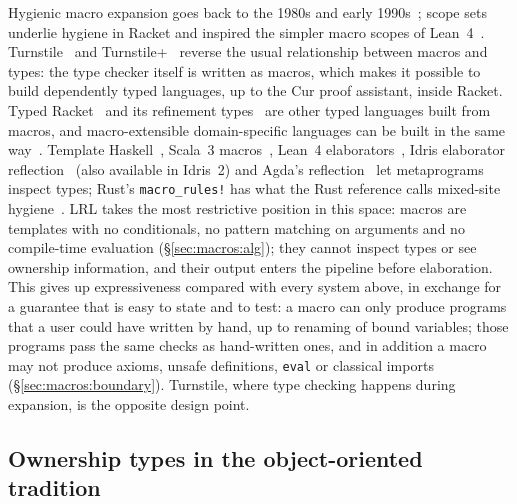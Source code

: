 Hygienic macro expansion goes back to the 1980s and early 1990s~\cite{kohlbecker1986,dybvig1993}; scope sets~\cite{flatt2016scopes} underlie hygiene in Racket and inspired the simpler macro scopes of Lean~4~\cite{ullrich2022}.
Turnstile~\cite{chang2017turnstile} and Turnstile+~\cite{chang2020dependent} reverse the usual relationship between macros and types: the type checker itself is written as macros, which makes it possible to build dependently typed languages, up to the Cur proof assistant, inside Racket.
Typed Racket~\cite{tobinhochstadt2008typedscheme,tobinhochstadt2011languages} and its refinement types~\cite{kent2016occurrence} are other typed languages built from macros, and macro-extensible domain-specific languages can be built in the same way~\cite{ballantyne2020macros}.
Template Haskell~\cite{sheard2002th}, Scala~3 macros~\cite{stucki2018scala,stucki2021multistage}, Lean~4 elaborators~\cite{ullrich2022}, Idris elaborator reflection~\cite{christiansen2016elab} (also available in Idris~2) and Agda's reflection~\cite{vanderwalt2013agda} let metaprograms inspect types; Rust's \lstinline|macro_rules!| has what the Rust reference calls mixed-site hygiene~\cite{rustmacros}.
LRL takes the most restrictive position in this space: macros are templates with no conditionals, no pattern matching on arguments and no compile-time evaluation (\S\ref{sec:macros:alg}); they cannot inspect types or see ownership information, and their output enters the pipeline before elaboration.
This gives up expressiveness compared with every system above, in exchange for a guarantee that is easy to state and to test: a macro can only produce programs that a user could have written by hand, up to renaming of bound variables; those programs pass the same checks as hand-written ones, and in addition a macro may not produce axioms, unsafe definitions, \lstinline|eval| or classical imports (\S\ref{sec:macros:boundary}).
Turnstile, where type checking happens during expansion, is the opposite design point.

\subsection{Ownership types in the object-oriented tradition}\label{sec:related:oo}

